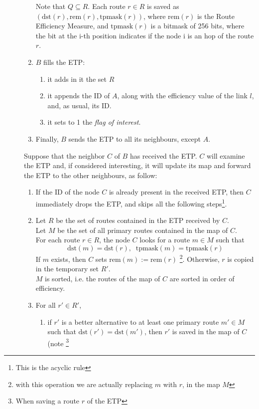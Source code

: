 \documentclass[a4paper]{article}
\newcommand{\T}[1]{\textrm{#1}}
\begin{document}
\begin{description}
\begin{enumerate}
			Note that $Q\subseteq R$.
			Each
			route $r\in R$ is saved as $(\T{dst}(r), \T{rem}(r), \T{tpmask}(r))$, where $\T{rem}(r)$ is the Route
			Efficiency Measure, and $\T{tpmask}(r)$ is a bitmask of 256
			bits, where the bit at the i-th position indicates if
			the node i is an hop of the route $r$.
		\item $B$ fills the ETP: 
			\begin{enumerate}
				\item it adds in it the set $R$
				\item it appends the ID of $A$, along with the efficiency
					value of the link $l$, and, as usual, its ID.
				\item it sets to 1 the \emph{flag of interest}.
			\end{enumerate}
		\item Finally, $B$ sends the ETP to all its neighbours, except $A$.
		\end{enumerate}
		\label{ETPrule1}
		Suppose that the neighbor $C$ of $B$ has received the ETP. $C$
		will examine the ETP and, if considered interesting, it 
	will update its map and forward the ETP to the other neighbours, as
		follow:
		\begin{enumerate}
		\item If the ID of the node $C$ is already present in the
			received ETP, then $C$ immediately drops the ETP, and
			skips all the following steps\footnote{This is the acyclic
			rule}.
		\item Let $R$ be the set of routes contained in the
			ETP received by $C$.\\
			Let $M$ be the set of all primary routes contained in the map of $C$.\\
		For each route $r\in R$, the node $C$ looks for 
		a route $m\in M$ such that 
		\[\T{dst}(m)=\T{dst}(r),\;\;\T{tpmask}(m)=\T{tpmask}(r)\]
		If $m$ exists, then $C$ sets $\T{rem}(m):=\T{rem}(r)$
		\footnote{with this operation we are actually replacing $m$
		with $r$, in the map $M$}.
		Otherwise, $r$ is copied in the temporary set $R'$.\\
		$M$ is sorted, i.e. the routes of the map of $C$ are sorted in
		order of efficiency.
	\item For all $r' \in R'$,
		\begin{enumerate}
			\item if $r'$ is a better alternative to at least one primary route
				$m'\in M$ such that $\T{dst}(r')=\T{dst}(m')$,
				then $r'$  is saved in the map of $C$
				(note \footnote{When saving a route $r$ of the ETP
}
\end{enumerate}
\end{enumerate}
\end{description}
\end{document}
